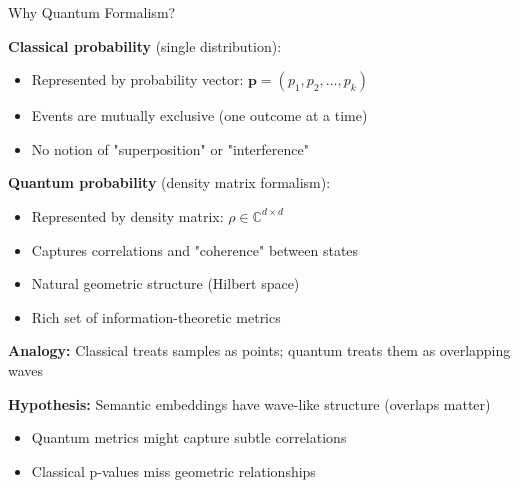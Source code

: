 \documentclass[aspectratio=169,11pt]{beamer}
\begin{document}
\begin{frame}{Why Quantum Formalism?}

\textbf{Classical probability} (single distribution):
\begin{itemize}
  \item Represented by probability vector: $\mathbf{p} = (p_1, p_2, \ldots, p_k)$
  \item Events are mutually exclusive (one outcome at a time)
  \item No notion of "superposition" or "interference"
\end{itemize}

\vspace{0.5em}

\textbf{Quantum probability} (density matrix formalism):
\begin{itemize}
  \item Represented by density matrix: $\rho \in \mathbb{C}^{d \times d}$
  \item Captures correlations and "coherence" between states
  \item Natural geometric structure (Hilbert space)
  \item Rich set of information-theoretic metrics
\end{itemize}

\vspace{0.5em}

\textbf{Analogy:} Classical treats samples as points; quantum treats them as overlapping waves

\vspace{0.5em}

\textbf{Hypothesis:} Semantic embeddings have wave-like structure (overlaps matter)
\begin{itemize}
  \item Quantum metrics might capture subtle correlations
  \item Classical p-values miss geometric relationships
\end{itemize}

\end{frame}
\end{document}
